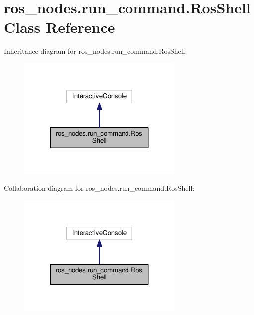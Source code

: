 \hypertarget{classros__nodes_1_1run__command_1_1RosShell}{}\section{ros\+\_\+nodes.\+run\+\_\+command.\+Ros\+Shell Class Reference}
\label{classros__nodes_1_1run__command_1_1RosShell}


Inheritance diagram for ros\+\_\+nodes.\+run\+\_\+command.\+Ros\+Shell\+:\nopagebreak
\begin{figure}[H]
\begin{center}
\leavevmode
\includegraphics[width=227pt]{classros__nodes_1_1run__command_1_1RosShell__inherit__graph}
\end{center}
\end{figure}


Collaboration diagram for ros\+\_\+nodes.\+run\+\_\+command.\+Ros\+Shell\+:\nopagebreak
\begin{figure}[H]
\begin{center}
\leavevmode
\includegraphics[width=227pt]{classros__nodes_1_1run__command_1_1RosShell__coll__graph}
\end{center}
\end{figure}
